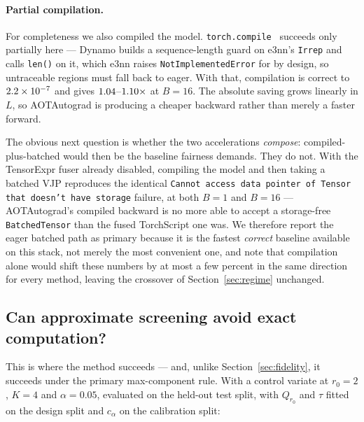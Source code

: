 \documentclass{article}
\begin{document}
\paragraph{Partial compilation.}
For completeness we also compiled the model. \texttt{torch.compile}~\citep{torchcompile} succeeds only partially here ---
Dynamo builds a sequence-length guard on e3nn's \texttt{Irrep} and calls \texttt{len()} on it, which
e3nn raises \texttt{NotImplementedError} for by design, so untraceable regions must fall back to
eager. With that, compilation is correct to $2.2\times10^{-7}$ and gives
$1.04$--$1.10\times$ at $B{=}16$. The absolute saving grows linearly in
$L$, so AOTAutograd is producing a cheaper backward rather than merely a faster forward.

The obvious next question is whether the two accelerations \emph{compose}: compiled-plus-batched
would then be the baseline fairness demands. They do not. With the TensorExpr fuser already disabled,
compiling the model and then taking a batched VJP reproduces the identical
\texttt{Cannot access data pointer of Tensor that doesn't have storage} failure, at both $B{=}1$ and
$B{=}16$ --- AOTAutograd's compiled backward is no more able to accept a storage-free
\texttt{BatchedTensor} than the fused TorchScript one was. We therefore report the eager batched
path as primary because it is the fastest \emph{correct} baseline available on this stack, not
merely the most convenient one, and note that compilation alone would shift these numbers by at most
a few percent in the same direction for every method, leaving the crossover of
Section~\ref{sec:regime} unchanged.

\subsection{Can approximate screening avoid exact computation?}
\label{sec:screening}
This is where the method succeeds --- and, unlike Section~\ref{sec:fidelity}, it succeeds under the
primary max-component rule. With a control variate at $r_0{=}2$, $K{=}4$ and $\alpha{=}0.05$,
evaluated on the held-out test split, with $Q_{r_0}$ and $\tau$ fitted on the design split and
$c_\alpha$ on the calibration split:
\end{document}
